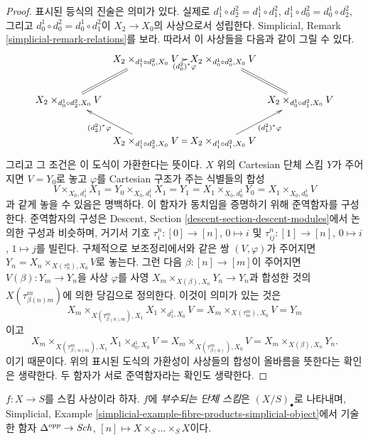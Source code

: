 \begin{proof}
표시된 등식의 진술은 의미가 있다. 실제로
$d^1_1 \circ d^2_2 = d^1_1 \circ d^2_1$,
$d^1_1 \circ d^2_0 = d^1_0 \circ d^2_2$, 그리고
$d^1_0 \circ d^2_0 = d^1_0 \circ d^2_1$이 $X_2 \to X_0$의
사상으로서 성립한다. Simplicial, Remark
\ref{simplicial-remark-relations}를 보라.%
따라서 이 사상들을 다음과 같이 그릴 수 있다.
$$
\xymatrix@C=0.5em{
&
X_2 \times_{d^1_1 \circ d^2_0, X_0} V
\ar[r]_-{(d^2_0)^*\varphi} &
X_2 \times_{d^1_0 \circ d^2_0, X_0} V
\ar@{=}[rd] & \\
X_2 \times_{d^1_0 \circ d^2_2, X_0} V
\ar@{=}[ru] & & &
X_2 \times_{d^1_0 \circ d^2_1, X_0} V \\
&
X_2 \times_{d^1_1 \circ d^2_2, X_0} V
\ar[lu]^{(d^2_2)^*\varphi} \ar@{=}[r] &
X_2 \times_{d^1_1 \circ d^2_1, X_0} V
\ar[ru]_{(d^2_1)^*\varphi}
}
$$
그리고 그 조건은 이 도식이 가환한다는 뜻이다.
$X$ 위의 Cartesian 단체 스킴 $Y$가 주어지면 $V = Y_0$로 놓고
$\varphi$를 Cartesian 구조가 주는 식별들의 합성
$$
V \times_{X_0, d^1_1} X_1 =
Y_0 \times_{X_0, d^1_1} X_1 = Y_1 =
X_1 \times_{X_0, d^1_0} Y_0 =
X_1 \times_{X_0, d^1_0} V
$$
과 같게 놓을 수 있음은 명백하다. 이 함자가 동치임을 증명하기 위해
준역함자를 구성한다. 준역함자의 구성은 Descent, Section
\ref{descent-section-descent-modules}에서 논의한 구성과 비슷하며, 거기서
기호 $\tau^n_i : [0] \to [n]$, $0 \mapsto i$ 및
$\tau^n_{ij} : [1] \to [n]$, $0 \mapsto i$, $1 \mapsto j$를 빌린다.
구체적으로 보조정리에서와 같은 쌍 $(V, \varphi)$가 주어지면
$Y_n = X_n \times_{X(\tau^n_n), X_0} V$로 놓는다.
그런 다음 $\beta : [n] \to [m]$이 주어지면
$V(\beta) : Y_m \to Y_n$을 사상 $\varphi$를 사영
$X_m \times_{X(\beta), X_n} Y_n \to Y_n$과 합성한 것의
$X(\tau^m_{\beta(n)m})$에 의한 당김으로 정의한다. 이것이 의미가 있는 것은
$$
X_m \times_{X(\tau^m_{\beta(n)m}), X_1} X_1 \times_{d^1_1, X_0} V
=
X_m \times_{X(\tau^m_m), X_0} V = Y_m
$$
이고
$$
X_m \times_{X(\tau^m_{\beta(n)m}), X_1} X_1 \times_{d^1_0, X_0} V =
X_m \times_{X(\tau^m_{\beta(n)}), X_0} V =
X_m \times_{X(\beta), X_n} Y_n.
$$
이기 때문이다. 위의 표시된 도식의 가환성이 사상들의 합성이 올바름을
뜻한다는 확인은 생략한다. 두 함자가 서로 준역함자라는 확인도 생략한다.
\end{proof}

\begin{definition}
\label{definition-fibre-products-simplicial-scheme}
$f : X \to S$를 스킴 사상이라 하자. $f$에 {\it 부수되는 단체 스킴}은
$(X/S)_\bullet$로 나타내며, Simplicial, Example
\ref{simplicial-example-fibre-products-simplicial-object}에서 기술한 함자
$\Delta^{opp} \to \mathit{Sch}$, $[n] \mapsto X \times_S \ldots \times_S X$이다.
\end{definition}

